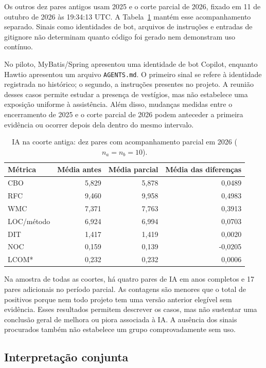 Os outros dez pares antigos usam 2025 e o corte parcial de 2026, fixado em 11 de outubro de 2026 às 19:34:13 UTC. A Tabela~\ref{tab:historico-ia-parcial} mantém esse acompanhamento separado. Sinais como identidades de bot, arquivos de instruções e entradas de gitignore não determinam quanto código foi gerado nem demonstram uso contínuo.

No piloto, MyBatis/Spring apresentou uma identidade de bot Copilot, enquanto Hawtio apresentou um arquivo \texttt{AGENTS.md}. O primeiro sinal se refere à identidade registrada no histórico; o segundo, a instruções presentes no projeto. A reunião desses casos permite estudar a presença de vestígios, mas não estabelece uma exposição uniforme à assistência. Além disso, mudanças medidas entre o encerramento de 2025 e o corte parcial de 2026 podem anteceder a primeira evidência ou ocorrer depois dela dentro do mesmo intervalo.

\begin{table}[htbp]
\centering\small
\caption{IA na coorte antiga: dez pares com acompanhamento parcial em 2026 ($n_a=n_b=10$).}
\label{tab:historico-ia-parcial}
\begin{tabular}{lrrr}
\hline
Métrica & Média antes & Média parcial & Média das diferenças \\
\hline
CBO & 5,829 & 5,878 & 0,0489 \\
RFC & 9,460 & 9,958 & 0,4983 \\
WMC & 7,371 & 7,763 & 0,3913 \\
LOC/método & 6,924 & 6,994 & 0,0703 \\
DIT & 1,417 & 1,419 & 0,0020 \\
NOC & 0,159 & 0,139 & -0,0205 \\
LCOM* & 0,232 & 0,232 & 0,0006 \\
\hline
\end{tabular}
\end{table}

Na amostra de todas as coortes, há quatro pares de IA em anos completos e 17 pares adicionais no período parcial. As contagens são menores que o total de positivos porque nem todo projeto tem uma versão anterior elegível sem evidência. Esses resultados permitem descrever os casos, mas não sustentar uma conclusão geral de melhora ou piora associada à IA. A ausência dos sinais procurados também não estabelece um grupo comprovadamente sem uso.

\subsection{Interpretação conjunta}

